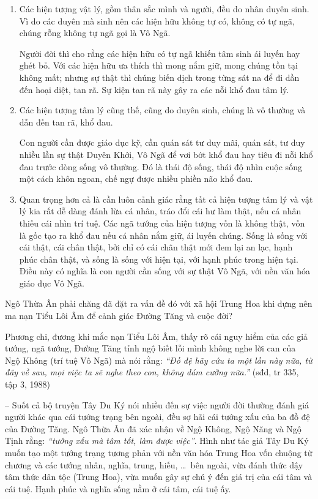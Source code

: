 \begin{enumerate}[label=\itshape\alph*\upshape/]
    \item Các hiện tượng vật lý, gồm thân sắc mình và người, đều do nhân duyên sinh. Vì do các duyên mà sinh nên các hiện hữu không tự có, không có tự ngã, chúng rỗng không tự ngã gọi là Vô Ngã.

    Người đời thì cho rằng các hiện hữu có tự ngã khiến tâm sinh ái luyến hay ghét bỏ. Với các hiện hữu ưa thích thì mong nắm giữ, mong chúng tồn tại không mất; nhưng sự thật thì chúng biến dịch trong từng sát na để đi dần đến hoại diệt, tan rã. Sự kiện tan rã này gây ra các nỗi khổ đau tâm lý.

    \item Các hiện tượng tâm lý cũng thế, cũng do duyên sinh, chúng là vô thường và dẫn đến tan rã, khổ đau.

    Con người cần được giáo dục kỹ, cần quán sát tư duy mãi, quán sát, tư duy nhiều lần sự thật Duyên Khởi, Vô Ngã để vơi bớt khổ đau hay tiêu đi nỗi khổ đau trước dòng sống vô thường. Đó là thái độ sống, thái độ nhìn cuộc sống một cách khôn ngoan, chế ngự được nhiều phiền não khổ đau.

    \item Quan trọng hơn cả là cần luôn cảnh giác rằng tất cả hiện tượng tâm lý và vật lý kia rất dễ dàng đánh lừa cá nhân, tráo đổi cái hư làm thật, nếu cá nhân thiếu cái nhìn trí tuệ. Các ngã tướng của hiện tượng vốn là không thật, vốn là gốc tạo ra khổ đau nếu cá nhân nắm giữ, ái luyến chúng. Sống là sống với cái thật, cái chân thật, bởi chỉ có cái chân thật mới đem lại an lạc, hạnh phúc chân thật, và sống là sống với hiện tại, với hạnh phúc trong hiện tại. Điều này có nghĩa là con người cần sống với sự thật Vô Ngã, với nền văn hóa giáo dục Vô Ngã.
\end{enumerate}

Ngô Thừa Ân phải chăng đã đặt ra vấn đề đó với xã hội Trung Hoa khi dựng nên ma nạn Tiểu Lôi Âm để cảnh giác Đường Tăng và cuộc đời?

Phương chi, đương khi mắc nạn Tiểu Lôi Âm, thấy rõ cái nguy hiểm của các giả tướng, ngã tướng, Đường Tăng tỉnh ngộ biết lỗi mình không nghe lời can của Ngộ Không (trí tuệ Vô Ngã) mà nói rằng: \emph{``Đồ đệ hãy cứu ta một lần này nữa, từ đây về sau, mọi việc ta sẽ nghe theo con, không dám cưỡng nữa.''} (sđd, tr 335, tập 3, 1988)

-- Suốt cả bộ truyện Tây Du Ký nói nhiều đến sự việc người đời thường đánh giá người khác qua cái tướng trạng bên ngoài, đều sợ hãi cái tướng xấu của ba đồ đệ của Đường Tăng. Ngô Thừa Ân đã xác nhận về Ngộ Không, Ngộ Năng và Ngộ Tịnh rằng: \emph{``tướng xấu mà tâm tốt, làm được việc''}. Hình như tác giả Tây Du Ký muốn tạo một tướng trạng tương phản với nền văn hóa Trung Hoa vốn chuộng từ chương và các tướng nhân, nghĩa, trung, hiếu, \ldots ~bên ngoài, vừa đánh thức dậy tâm thức dân tộc (Trung Hoa), vừa muốn gây sự chú ý đến giá trị của cái tâm và cái tuệ. Hạnh phúc và nghĩa sống nằm ở cái tâm, cái tuệ ấy.

